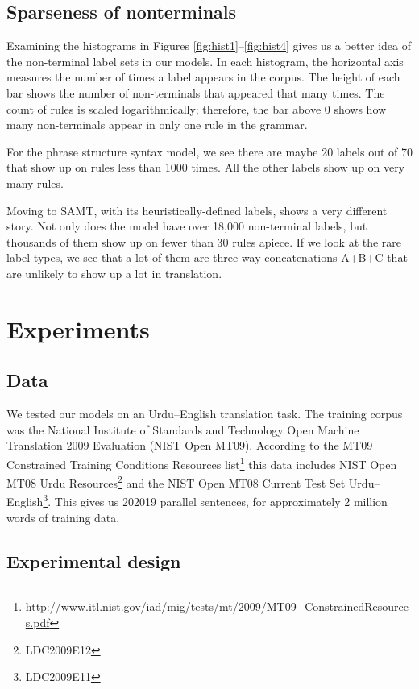 \documentclass{article}
\begin{document}
\subsection{Sparseness of nonterminals}

Examining the histograms in Figures \ref{fig:hist1}--\ref{fig:hist4} gives us a better idea of the non-terminal label sets in our models. In each histogram, the horizontal axis measures the number of times a label appears in the corpus. The height of each bar shows the number of non-terminals that appeared that many times. The count of rules is scaled logarithmically; therefore, the bar above 0 shows how many non-terminals appear in only one rule in the grammar.

For the phrase structure syntax model, we see there are maybe 20 labels out of 70 that show up on rules less than 1000 times. All the other labels show up on very many rules.

Moving to SAMT, with its heuristically-defined labels, shows a very different story. Not only does the model have over 18,000 non-terminal labels, but thousands of them show up on fewer than 30 rules apiece. If we look at the rare label types, we see that a lot of them are three way concatenations A+B+C that are unlikely to show up a lot in translation. 

\section{Experiments}

\subsection{Data}

We tested our models on an Urdu--English translation task. The training corpus was the National Institute of Standards and Technology Open Machine Translation 2009 Evaluation (NIST Open MT09). According to the MT09 Constrained Training Conditions Resources list\footnote{\url{http://www.itl.nist.gov/iad/mig/tests/mt/2009/MT09_ConstrainedResources.pdf}} this data includes NIST Open MT08 Urdu Resources\footnote{LDC2009E12} and the NIST Open MT08 Current Test Set Urdu--English\footnote{LDC2009E11}. This gives us 202019 parallel sentences, for approximately 2 million words of training data.

\subsection{Experimental design}
\end{document}
